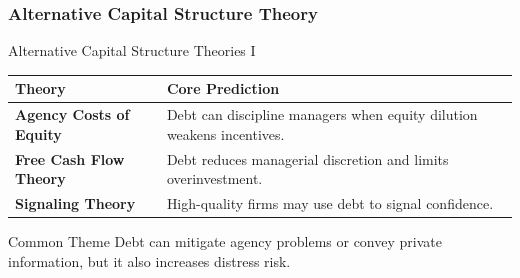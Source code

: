 \subsubsection*{Alternative Capital Structure Theory}
\begin{frame}{Alternative Capital Structure Theories I}
\small
\begin{table}[ht]
\centering
\begin{tabular}{p{3.5cm}p{7.7cm}}
\toprule
\textbf{Theory} & \textbf{Core Prediction} \\
\midrule

\textbf{Agency Costs of Equity} 
{ \parencite{jensen1976theory}}
& Debt can discipline managers when equity dilution weakens incentives. \\

\addlinespace[0.35em]

\textbf{Free Cash Flow Theory}
{ \parencite{jensen1986agency}}
& Debt reduces managerial discretion and limits overinvestment. \\

\addlinespace[0.35em]

\textbf{Signaling Theory}
{ \parencite{ross1977signaling}}
& High-quality firms may use debt to signal confidence. \\

\bottomrule
\end{tabular}
\end{table}

\vfill

\begin{block}{Common Theme}
Debt can mitigate agency problems or convey private information, but it also increases distress risk.
\end{block}

\end{frame}

